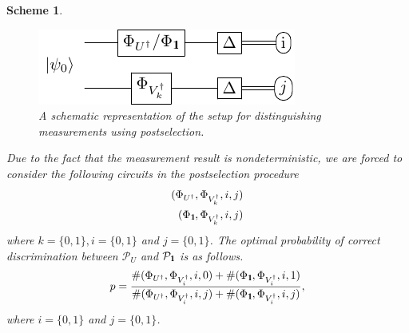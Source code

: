\documentclass[preprint,12pt, a4paper]{elsarticle}
\newcommand{\1}{{\rm 1\hspace{-0.9mm}l}}
\newcommand{\Id}{{\rm 1\hspace{-0.9mm}l}}
\newcommand{\PP}{\mathcal{P}}
\newtheorem{scheme}{Scheme}
\begin{document}
\begin{scheme}
\begin{figure}[h!]
	\centering 
	\includegraphics[scale=1.7]{pics/postselection} 
	
	\caption{ A schematic representation of the setup for distinguishing
		measurements using postselection. 
	}\label{fig:postsellection}
\end{figure}  

Due to the fact that the measurement result is nondeterministic, we are forced to consider the following circuits
in the postselection procedure
\begin{equation}
\begin{split}
(\Phi_{U^\dagger}, \Phi_{V_k^\dagger}, i, j) \\ 
(\Phi_{\Id}, \Phi_{V_k^\dagger}, i, j)
\end{split}
\end{equation}
where $k=\{0,1\}, i=\{0,1\}$ and $ j=\{0,1\}$. 
The optimal probability of correct discrimination between $\PP_{U} $ and $\PP_\Id$ is as follows.
		\begin{equation}
		p = \frac{\#(\Phi_{U^\dagger}, \Phi_{V_i^\dagger},i,0) + \#(\Phi_\Id, \Phi_{V_i^\dagger},i,1)}{\#(\Phi_{U^\dagger}, \Phi_{V_i^\dagger},i,j) + \#(\Phi_\Id, \Phi_{V_i^\dagger},i,j)}, 
		\end{equation}
where $i=\{0,1\}$ and $ j=\{0,1\}$. 

\end{scheme}
\end{document}
